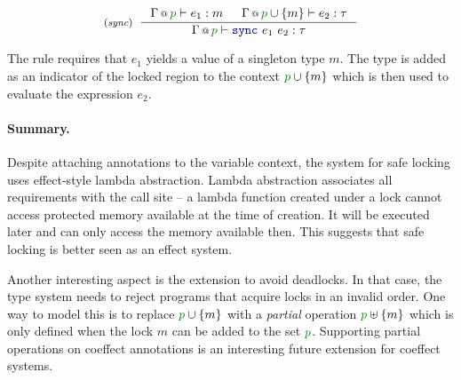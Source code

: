 \noindent
\vspace{-0.5em}
\begin{equation*}
\tyrule{sync}
  { \coctx{\Gamma}{\cclrd{p}} \vdash e_1 : m&
    \coctx{\Gamma}{\cclrd{p} \cup \{m\} } \vdash e_2 : \tau }
  { \coctx{\Gamma}{\cclrd{p}} \vdash \kvd{sync}~e_1~e_2 : \tau }
\end{equation*}
\vspace{-0.5em}

\noindent
The rule requires that $e_1$ yields a value of a singleton type $m$. The type is added as an
indicator of the locked region to the context $\cclrd{p}\cup \{m\}$ which is then used to evaluate
the expression $e_2$.

\paragraph{Summary.}
Despite attaching annotations to the variable context, the system for safe locking uses
effect-style lambda abstraction. Lambda abstraction associates all requirements with the
call site -- a lambda function created under a lock cannot access protected memory available at
the time of creation. It will be executed later and can only access the memory available then.
This suggests that safe locking is better seen as an effect system.

Another interesting aspect is the extension to avoid deadlocks. In that case, the type system
needs to reject programs that acquire locks in an invalid order. One way to model this is to
replace $\cclrd{p} \cup \{m\}$ with a \emph{partial} operation $\cclrd{p} \uplus \{m\}$ which
is only defined when the lock $m$ can be added to the set $\cclrd{p}$. Supporting partial
operations on coeffect annotations is an interesting future extension for coeffect systems.



%
%

